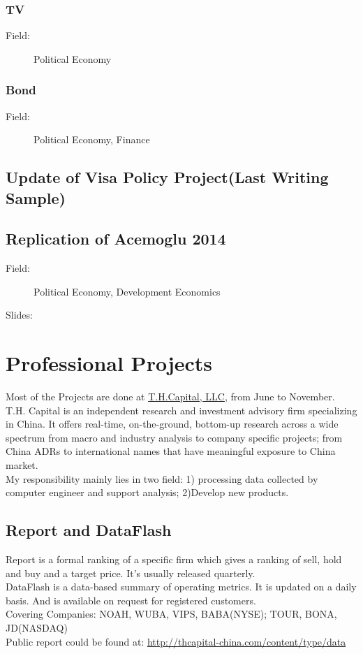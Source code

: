 \documentclass{article}
\begin{document}
\subsubsection{TV}
\begin{description}
\item[Field:] Political Economy
\end{description}
\subsubsection{Bond}
\begin{description}
\item[Field:] Political Economy, Finance
\end{description}

\subsection{Update of Visa Policy Project(Last Writing Sample)}

\subsection{Replication of Acemoglu 2014}
\begin{description}
\item[Field:] Political Economy, Development Economics
\item[Slides:]
\end{description}



\newpage
\section{Professional Projects}
Most of the Projects are done at \href{http://thcapital-china.com/}{T.H.Capital, LLC}, from June to November. T.H. Capital is an independent research and investment advisory firm specializing in China. It offers real-time, on-the-ground, bottom-up research across a wide spectrum from macro and industry analysis to company specific projects; from China ADRs to international names that have meaningful exposure to China market. \\
My responsibility mainly lies in two field: 1) processing data collected by computer engineer and support analysis; 2)Develop new products.


\subsection{Report and DataFlash}
Report is a formal ranking of a specific firm which gives a ranking of sell, hold and buy and a target price. It's usually released quarterly.\\
DataFlash is a data-based summary of operating metrics. It is updated on a daily basis. And is available on request for registered customers.\\
Covering Companies: NOAH, WUBA, VIPS, BABA(NYSE); TOUR, BONA, JD(NASDAQ) \\
Public report could be found at: \url{http://thcapital-china.com/content/type/data}
\end{document}
